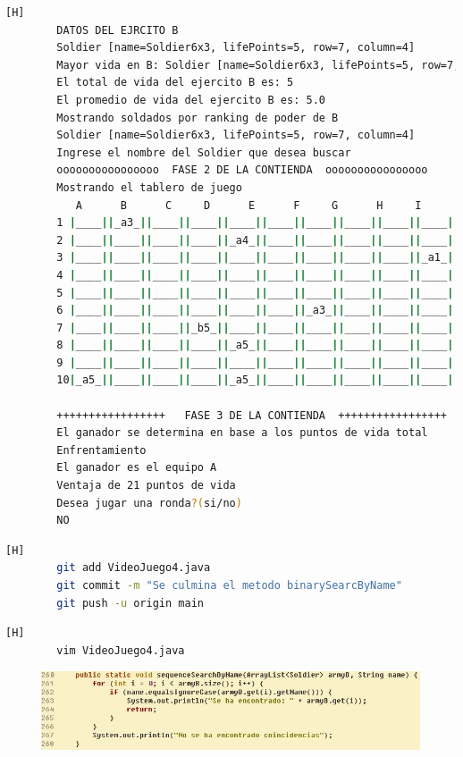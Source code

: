 \documentclass{article}
\begin{document}
\begin{lstlisting}[language=bash,caption={Compilando y probando  }][H]
		DATOS DEL EJRCITO B
		Soldier [name=Soldier6x3, lifePoints=5, row=7, column=4]
		Mayor vida en B: Soldier [name=Soldier6x3, lifePoints=5, row=7, column=4]
		El total de vida del ejercito B es: 5
		El promedio de vida del ejercito B es: 5.0
		Mostrando soldados por ranking de poder de B
		Soldier [name=Soldier6x3, lifePoints=5, row=7, column=4]
		Ingrese el nombre del Soldier que desea buscar
		oooooooooooooooo  FASE 2 DE LA CONTIENDA  oooooooooooooooo
		Mostrando el tablero de juego
		   A      B      C     D      E      F     G      H     I      J
		1 |____||_a3_||____||____||____||____||____||____||____||____|
		2 |____||____||____||____||_a4_||____||____||____||____||____|
		3 |____||____||____||____||____||____||____||____||____||_a1_|
		4 |____||____||____||____||____||____||____||____||____||____|
		5 |____||____||____||____||____||____||____||____||____||____|
		6 |____||____||____||____||____||____||_a3_||____||____||____|
		7 |____||____||____||_b5_||____||____||____||____||____||____|
		8 |____||____||____||____||_a5_||____||____||____||____||____|
		9 |____||____||____||____||____||____||____||____||____||____|
		10|_a5_||____||____||____||_a5_||____||____||____||____||____|
		
		+++++++++++++++++   FASE 3 DE LA CONTIENDA  +++++++++++++++++
		El ganador se determina en base a los puntos de vida total
		Enfrentamiento
		El ganador es el equipo A
		Ventaja de 21 puntos de vida
		Desea jugar una ronda?(si/no)
		NO
	\end{lstlisting}
	
	
	\begin{lstlisting}[language=bash,caption={Commit: dde0af374ba825d7f45cb32605658c8624920f51}][H]
		git add VideoJuego4.java
		git commit -m "Se culmina el metodo binarySearcByName"			
		git push -u origin main
	\end{lstlisting}
	
	
	
	
			
	\begin{lstlisting}[language=bash,caption={Se implementa un método que realiza una búsqueda secuencial según el nombre}][H]
		vim VideoJuego4.java
	\end{lstlisting}
	
	
	\begin{figure}[H]
		\centering
		\includegraphics[width=1\textwidth,keepaspectratio]{img/sequence.jpg}
	\end{figure}
	
\end{document}
